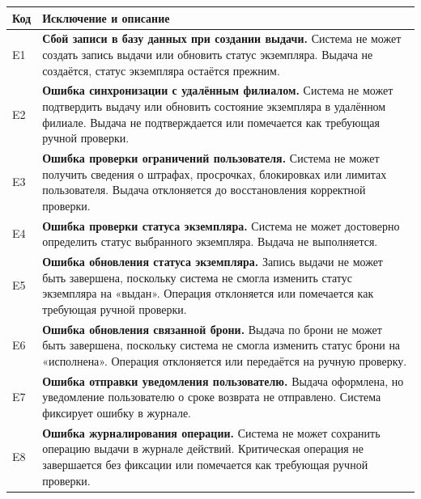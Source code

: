 \documentclass[12pt,a4paper]{article}
\begin{document}
\begin{xltabular}{\textwidth}{
				|>{\raggedright\arraybackslash}p{2.7cm}
				|>{\raggedright\arraybackslash}X|
			}
			
			\textbf{Код} & \textbf{Исключение и описание} \\
			\hline
			
			E1 &
			\textbf{Сбой записи в базу данных при создании выдачи.}
			Система не может создать запись выдачи или обновить статус экземпляра.
			Выдача не создаётся, статус экземпляра остаётся прежним. \\
			\hline
			
			E2 &
			\textbf{Ошибка синхронизации с удалённым филиалом.}
			Система не может подтвердить выдачу или обновить состояние
			экземпляра в удалённом филиале. Выдача не подтверждается или
			помечается как требующая ручной проверки. \\
			\hline
			
			E3 &
			\textbf{Ошибка проверки ограничений пользователя.}
			Система не может получить сведения о штрафах, просрочках,
			блокировках или лимитах пользователя. Выдача отклоняется до
			восстановления корректной проверки. \\
			\hline
			
			E4 &
			\textbf{Ошибка проверки статуса экземпляра.}
			Система не может достоверно определить статус выбранного экземпляра.
			Выдача не выполняется. \\
			\hline
			
			E5 &
			\textbf{Ошибка обновления статуса экземпляра.}
			Запись выдачи не может быть завершена, поскольку система не смогла
			изменить статус экземпляра на «выдан». Операция отклоняется или
			помечается как требующая ручной проверки. \\
			\hline
			
			E6 &
			\textbf{Ошибка обновления связанной брони.}
			Выдача по брони не может быть завершена, поскольку система не смогла
			изменить статус брони на «исполнена». Операция отклоняется или
			передаётся на ручную проверку. \\
			\hline
			
			E7 &
			\textbf{Ошибка отправки уведомления пользователю.}
			Выдача оформлена, но уведомление пользователю о сроке возврата не
			отправлено. Система фиксирует ошибку в журнале. \\
			\hline
			
			E8 &
			\textbf{Ошибка журналирования операции.}
			Система не может сохранить операцию выдачи в журнале действий.
			Критическая операция не завершается без фиксации или помечается как
			требующая ручной проверки. \\
			\hline
			

\end{xltabular}
\end{document}
